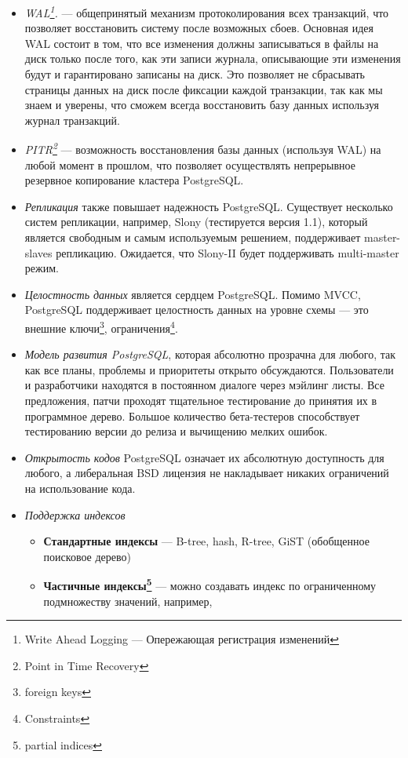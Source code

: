\documentclass[a4paper,12pt,notitlepage,headsepline,pdftex]{scrartcl}
\begin{document}
\begin{itemize}
    \item \emph{WAL\footnote{Write Ahead Logging --- Опережающая регистрация
      изменений}.} --- общепринятый механизм протоколирования всех транзакций,
      что позволяет восстановить систему после возможных сбоев.
      Основная идея WAL состоит в том, что все изменения должны записываться в
      файлы на диск только после того, как эти записи журнала, описывающие эти
      изменения будут и гарантировано записаны на диск.
      Это позволяет не сбрасывать страницы данных на диск после фиксации
      каждой транзакции, так как мы знаем и уверены, что сможем всегда
      восстановить базу данных используя журнал транзакций.
    \item \emph{PITR\footnote{Point in Time Recovery}} --- возможность
      восстановления базы данных (используя WAL) на любой момент в прошлом,
      что позволяет осуществлять непрерывное резервное копирование кластера
      PostgreSQL.
    \item \emph{Репликация} также повышает надежность PostgreSQL.
      Существует несколько систем репликации, например, Slony (тестируется
      версия 1.1), который является свободным и самым используемым решением,
      поддерживает master-slaves репликацию. Ожидается, что Slony-II будет
      поддерживать multi-master режим.
    \item \emph{Целостность данных} является сердцем PostgreSQL.
      Помимо MVCC, PostgreSQL поддерживает целостность данных на уровне схемы
      --- это внешние ключи\footnote{foreign keys},
      ограничения\footnote{Constraints}.
    \item \emph{Модель развития PostgreSQL}, которая абсолютно прозрачна для
      любого, так как все планы, проблемы и приоритеты открыто обсуждаются.
      Пользователи и разработчики находятся в постоянном диалоге через мэйлинг
      листы.
      Все предложения, патчи проходят тщательное тестирование до принятия их в
      программное дерево.
      Большое количество бета-тестеров способствует тестированию версии до
      релиза и вычищению мелких ошибок.
    \item \emph{Открытость кодов} PostgreSQL означает их абсолютную
      доступность для любого, а либеральная BSD лицензия не накладывает
      никаких ограничений на использование кода.
    \item \emph{Поддержка индексов}
      \begin{itemize}
        \item \textbf{Стандартные индексы} --- B-tree, hash, R-tree, GiST (обобщенное
          поисковое дерево)
        \item \textbf{Частичные индексы\footnote{partial indices}} --- можно
          создавать индекс по ограниченному подмножеству значений, например,


\end{itemize}
\end{itemize}
\end{document}
